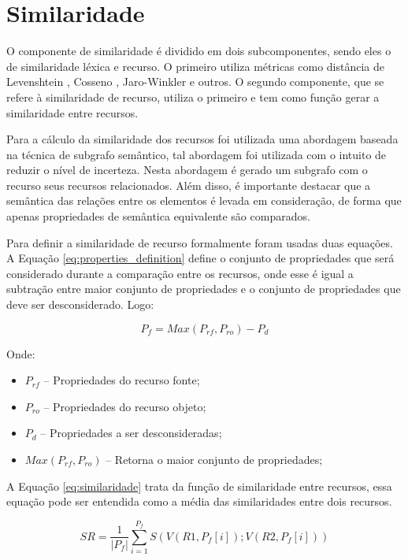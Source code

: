 \section*{Similaridade}
O componente de similaridade é dividido em dois subcomponentes, sendo eles o de similaridade léxica e recurso. O primeiro utiliza métricas como distância de Levenshtein \cite{levenshtein1966binary}, Cosseno \cite{singhal2001modern}, Jaro-Winkler \cite{winkler1990string} e outros. O segundo componente, que se refere à similaridade de recurso, utiliza o primeiro e tem como função gerar a similaridade entre recursos.

Para a cálculo da similaridade dos recursos foi utilizada uma abordagem baseada na técnica de subgrafo semântico, tal abordagem foi utilizada com o intuito de reduzir o nível de incerteza. Nesta abordagem é gerado um subgrafo com o recurso seus recursos relacionados. Além disso, é importante destacar que a semântica das relações entre os elementos é levada em consideração, de forma que apenas propriedades de semântica equivalente são comparados.

Para definir a similaridade de recurso formalmente foram usadas duas equações. A Equação \ref{eq:properties_definition} define o conjunto de propriedades que será considerado durante a comparação entre os recursos, onde esse é igual a subtração entre maior conjunto de propriedades e o conjunto de propriedades que deve ser desconsiderado. Logo:

\begin{equation}
P_f =M a x  ( P_{r f} ,P_{r o} ) - P_d
\label{eq:properties_definition}
\end{equation}

Onde:
\begin{itemize}
	\item $P_{r f}$ – Propriedades do recurso fonte;
	\item $P_{r o}$ –  Propriedades do recurso objeto;
	\item $P_d$ –  Propriedades a ser desconsideradas;
	\item $M a x  ( P_{r f} ,P_{r o} )$ – Retorna o maior conjunto de propriedades;
\end{itemize}

A Equação \ref{eq:similaridade} trata da função de similaridade entre recursos, essa equação pode ser entendida como a média das similaridades entre dois recursos.

\begin{equation}
SR  = \frac{1}{|P_f|} { \sum_{i = 1}^{P_f} {S(V(R1,P_f[i]);V(R2,P_f[i]))}}
\label{eq:similaridade}
\end{equation}

